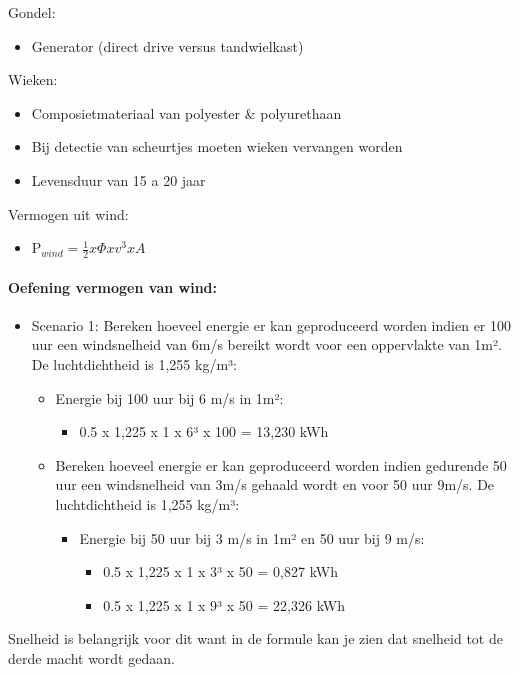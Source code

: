 \documentclass[12pt]{article}
\begin{document}
Gondel:\begin{itemize}
    \item Generator (direct drive versus tandwielkast)
\end{itemize}
Wieken:\begin{itemize}
    \item Composietmateriaal van polyester \& polyurethaan 
    \item Bij detectie van scheurtjes moeten wieken vervangen worden 
    \item Levensduur van 15 a 20 jaar
\end{itemize}
Vermogen uit wind:\begin{itemize}
    \item P$_{wind}=\frac{1}{2}x\Phi x v^3xA$
\end{itemize}
\paragraph{Oefening vermogen van wind:}
\begin{itemize}
    \item Scenario 1: Bereken hoeveel energie er kan geproduceerd worden indien er 100 uur een windsnelheid van 6m/s bereikt wordt voor een oppervlakte van 1m². De luchtdichtheid is 1,255 kg/m³:\begin{itemize}
        \item Energie bij 100 uur bij 6 m/s in 1m²:\begin{itemize}
            \item 0.5 x 1,225 x 1 x 6³ x 100 = 13,230 kWh
    \end{itemize}
    \item Bereken hoeveel energie er kan geproduceerd worden indien gedurende 50 uur een windsnelheid van 3m/s gehaald wordt en voor 50 uur 9m/s. De luchtdichtheid is 1,255 kg/m³:\begin{itemize}
        \item Energie bij 50 uur bij 3 m/s in 1m² en 50 uur bij 9 m/s:\begin{itemize}
            \item 0.5 x 1,225 x 1 x 3³ x 50 = 0,827 kWh
            \item 0.5 x 1,225 x 1 x 9³ x 50 = 22,326 kWh
        \end{itemize}
    \end{itemize}
    \end{itemize}
\end{itemize}
Snelheid is belangrijk voor dit want in de formule kan je zien dat snelheid tot de derde macht wordt gedaan.
\end{document}
